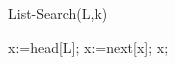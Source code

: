 \documentclass{article}
\begin{document}
	List-Search(L,k)
	\begin{algorithmic}[1]
		\STATE x:=head[L];
			\STATE x:=next[x];
		\ENDWHILE
		\RETURN x;
	\end{algorithmic}
\end{document}
